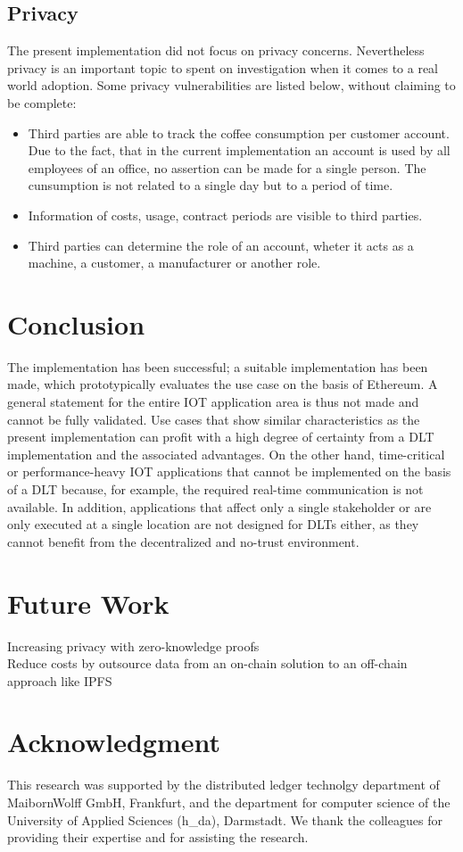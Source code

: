 \documentclass[conference]{IEEEtran}
\begin{document}
\subsection{Privacy}
The present implementation did not focus on privacy concerns. Nevertheless privacy is an important topic to spent on investigation when it comes to a real world adoption. Some privacy vulnerabilities are listed below, without claiming to be complete:\\
\begin{itemize}
  \item Third parties are able to track the coffee consumption per customer account. Due to the fact, that in the current implementation an account is used by all employees of an office, no assertion can be made for a single person. The cunsumption is not related to a single day but to a period of time.
  \item Information of costs, usage, contract periods are visible to third parties.
  \item Third parties can determine the role of an account, wheter it acts as a machine, a customer, a manufacturer or another role.
\end{itemize}


\section{Conclusion}
The implementation has been successful; a suitable implementation has been made, which prototypically evaluates the use case on the basis of Ethereum. A general statement for the entire IOT application area is thus not made and cannot be fully validated.  Use cases that show similar characteristics as the present implementation can profit with a high degree of certainty from a DLT implementation and the associated advantages. On the other hand, time-critical or performance-heavy IOT applications that cannot be implemented on the basis of a DLT because, for example, the required real-time communication is not available. In addition, applications that affect only a single stakeholder or are only executed at a single location are not designed for DLTs either, as they cannot benefit from the decentralized and no-trust environment.

\section{Future Work}
Increasing privacy with zero-knowledge proofs\\
Reduce costs by outsource data from an on-chain solution to an off-chain approach like IPFS\\

\section*{Acknowledgment}
This research was supported by the distributed ledger technolgy department of MaibornWolff GmbH, Frankfurt, and the department for computer science of the University of Applied Sciences (h\_da), Darmstadt. We thank the colleagues for providing their expertise and for assisting the research.





\end{document}
